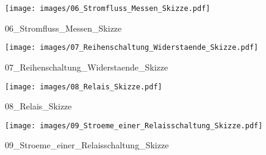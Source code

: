 %
%
\begin{figure}[!hb]%
    \centering
  \texttt{[image: images/06\_Stromfluss\_Messen\_Skizze.pdf]}%
  \caption{06_Stromfluss_Messen_Skizze}%
\end{figure}

%
%
\begin{figure}[!hb]%
    \centering
  \texttt{[image: images/07\_Reihenschaltung\_Widerstaende\_Skizze.pdf]}%
  \caption{07_Reihenschaltung_Widerstaende_Skizze}%
\end{figure}

%
%
\begin{figure}[!hb]%
    \centering
  \texttt{[image: images/08\_Relais\_Skizze.pdf]}%
  \caption{08_Relais_Skizze}%
\end{figure}

%
%
\begin{figure}[!hb]%
    \centering
  \texttt{[image: images/09\_Stroeme\_einer\_Relaisschaltung\_Skizze.pdf]}%
  \caption{09_Stroeme_einer_Relaisschaltung_Skizze}%
\end{figure}

